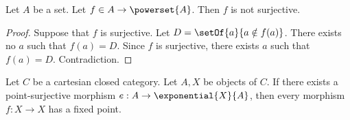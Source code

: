 \begin{theorem}[Cantor]
  Let $A$ be a set.
  Let $f\in A\to \powerset{A}$.
  Then $f$ is not surjective.
\end{theorem}

\begin{proof}
  Suppose that $f$ is surjective.
  Let $D = \setOf{a}{a\notin f(a)}$.
  There exists no $a$ such that $f(a) = D$.
  Since $f$ is surjective, there exists $a$ such that $f(a) = D$.
  Contradiction.
\end{proof}



\begin{theorem}[Lawvere]
  Let $C$ be a cartesian closed category.
  Let $A, X$ be objects of $C$.
  If there exists a point-surjective morphism $e : A\to \exponential{X}{A}$, %
  then every morphism $f : X\to X$ has a fixed point.
\end{theorem}


%
%
%
%
%
